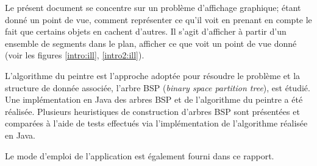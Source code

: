 Le présent document se concentre sur un problème d'affichage graphique;
étant donné un point de vue, comment représenter ce qu'il voit en
prenant en compte le fait que certains objets en cachent d'autres.
Il s'agit d'afficher à partir d'un ensemble de segments dans le
plan, afficher ce que voit un point de vue donné (voir les figures
\ref{intro:ill}, \ref{intro2:ill}).

L'algorithme du peintre est l'approche adoptée pour résoudre le problème et
la structure de donnée associée, l'arbre BSP
(\emph{binary space partition tree}), est étudié.
Une implémentation en Java des arbres BSP et de l'algorithme
du peintre a été réalisée. Plusieurs
heuristiques de construction d'arbres BSP sont présentées et
comparées à l'aide de tests effectués via l'implémentation
de l'algorithme réalisée en Java.

Le mode d'emploi de l'application
est également fourni dans ce rapport.



